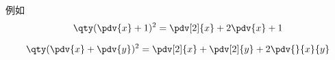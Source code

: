 
\begin{issues}
\issueDraft
\end{issues}


例如
\begin{equation}
\qty(\pdv{x} + 1)^2 = \pdv[2]{x} + 2\pdv{x} + 1
\end{equation}


\begin{equation}
\qty(\pdv{x} + \pdv{y})^2 = \pdv[2]{x} + \pdv[2]{y} + 2\pdv{}{x}{y}
\end{equation}
